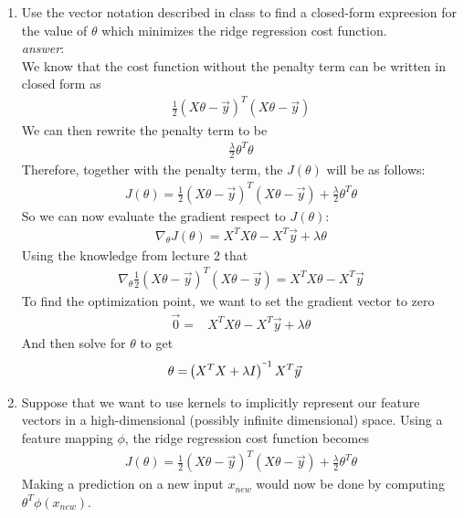 \documentclass{article}
\newcommand{\minus}{\scalebox{0.5}[1.0]{$-$}}
\begin{document}
\begin{enumerate}[label=(\alph*)]
    \item Use the vector notation described in class to find a closed-form expreesion for the
value of $\theta$ which minimizes the ridge regression cost function.\\
\textit{answer}: \\

We know that the cost function without the penalty term can be written in closed form as
\begin{align*}
    \frac{1}{2}\left(X\theta-\Vec{y}\right)^T\left(X\theta-\Vec{y}\right)
\end{align*}
We can then rewrite the penalty term to be
\begin{align*}
    \frac{\lambda}{2}\theta^T\theta
\end{align*}
Therefore, together with the penalty term, the $J(\theta)$ will be as follows: \begin{align*}
    J(\theta) = \frac{1}{2}\left(X\theta-\Vec{y}\right)^T\left(X\theta-\Vec{y}\right) + \frac{\lambda}{2}\theta^T\theta
\end{align*}
So we can now evaluate the gradient respect to $J(\theta)$: 
\begin{align*}
    \nabla_\theta J(\theta) = X^TX\theta -X^T\Vec{y} + \lambda\theta
\end{align*}
Using the knowledge from lecture 2 that
\begin{align*}
    \nabla_\theta \frac{1}{2}\left(X\theta-\Vec{y}\right)^T\left(X\theta-\Vec{y}\right) = X^TX\theta -X^T\Vec{y}
\end{align*}
To find the optimization point, we want to set the gradient vector to zero \begin{align*}
    \Vec{0} = &X^TX\theta -X^T\Vec{y} + \lambda\theta
\end{align*}
And then solve for $\theta$ to get
\begin{align*}
    \theta =& \left(X^TX+\lambda I\right)^{\minus1}X^T\Vec{y}
\end{align*}
\item Suppose that we want to use kernels to implicitly represent our feature vectors in a
high-dimensional (possibly infinite dimensional) space. Using a feature mapping $\phi$,
the ridge regression cost function becomes\begin{align*}
     J(\theta) = \frac{1}{2}\left(X\theta-\Vec{y}\right)^T\left(X\theta-\Vec{y}\right) + \frac{\lambda}{2}\theta^T\theta
\end{align*}Making a prediction on a new input $x_{new}$ would now be done by computing $\theta^T\phi (x_{new})$.

\end{enumerate}
\end{document}
